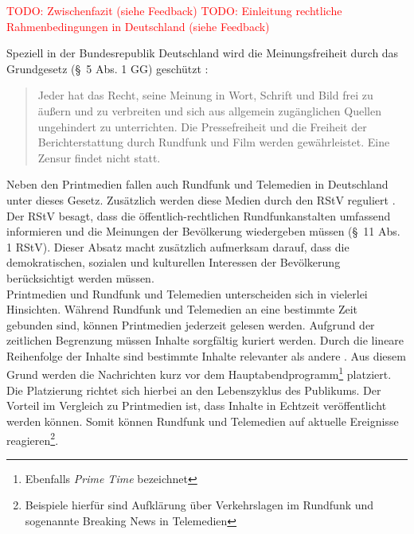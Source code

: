 \textcolor{red}{TODO: Zwischenfazit (siehe Feedback)}
\textcolor{red}{TODO: Einleitung rechtliche Rahmenbedingungen in Deutschland (siehe Feedback)}

Speziell in der Bundesrepublik Deutschland wird die Meinungsfreiheit durch das Grundgesetz (§ 5 Abs. 1 GG) geschützt \cite{gg}:
\begin{quote}
    \glqq Jeder hat das Recht, seine Meinung in Wort, Schrift und Bild frei zu äußern und zu verbreiten und sich aus allgemein zugänglichen Quellen ungehindert zu unterrichten.
    Die Pressefreiheit und die Freiheit der Berichterstattung durch Rundfunk und Film werden gewährleistet.
    Eine Zensur findet nicht statt.\grqq{}
\end{quote}
Neben den Printmedien fallen auch Rundfunk und Telemedien in Deutschland unter dieses Gesetz.
Zusätzlich werden diese Medien durch den \ac{RStV} reguliert \cite{rundfunkstaatsvertrag}.
Der \ac{RStV} besagt, dass die öffentlich-rechtlichen Rundfunkanstalten umfassend informieren und die Meinungen der Bevölkerung wiedergeben müssen (§ 11 Abs. 1 \ac{RStV}).
Dieser Absatz macht zusätzlich aufmerksam darauf, dass die demokratischen, sozialen und kulturellen Interessen der Bevölkerung berücksichtigt werden müssen. \\

Printmedien und Rundfunk und Telemedien unterscheiden sich in vielerlei Hinsichten.
Während Rundfunk und Telemedien an eine bestimmte Zeit gebunden sind, können Printmedien jederzeit gelesen werden.
Aufgrund der zeitlichen Begrenzung müssen Inhalte sorgfältig kuriert werden.
Durch die lineare Reihenfolge der Inhalte sind bestimmte Inhalte relevanter als andere \cite{rundfunk}.
Aus diesem Grund werden die Nachrichten kurz vor dem Hauptabendprogramm\footnote{Ebenfalls \textit{Prime Time} bezeichnet} platziert.
Die Platzierung richtet sich hierbei an den Lebenszyklus des Publikums.
Der Vorteil im Vergleich zu Printmedien ist, dass Inhalte in Echtzeit veröffentlicht werden können.
Somit können Rundfunk und Telemedien auf aktuelle Ereignisse reagieren\footnote{Beispiele hierfür sind Aufklärung über Verkehrslagen im Rundfunk und sogenannte Breaking News in Telemedien}. \\

